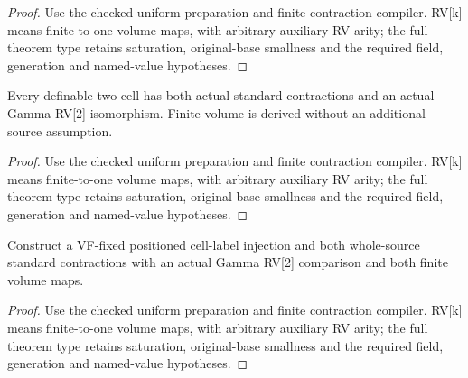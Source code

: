 \begin{proof}


\leanok

Use the checked uniform preparation and finite contraction compiler. RV[k] means finite-to-one volume maps, with arbitrary auxiliary RV arity; the full theorem type retains saturation, original-base smallness and the required field, generation and named-value hypotheses.

\end{proof}

\begin{lemma}

\label{s5-7}


\leanok

Every definable two-cell has both actual standard contractions and an actual Gamma RV[2] isomorphism. Finite volume is derived without an additional source assumption.

\end{lemma}

\begin{proof}


\leanok

Use the checked uniform preparation and finite contraction compiler. RV[k] means finite-to-one volume maps, with arbitrary auxiliary RV arity; the full theorem type retains saturation, original-base smallness and the required field, generation and named-value hypotheses.

\end{proof}

\begin{lemma}

\label{s5-8}


\leanok

Construct a VF-fixed positioned cell-label injection and both whole-source standard contractions with an actual Gamma RV[2] comparison and both finite volume maps.

\end{lemma}

\begin{proof}


\leanok

Use the checked uniform preparation and finite contraction compiler. RV[k] means finite-to-one volume maps, with arbitrary auxiliary RV arity; the full theorem type retains saturation, original-base smallness and the required field, generation and named-value hypotheses.

\end{proof}

